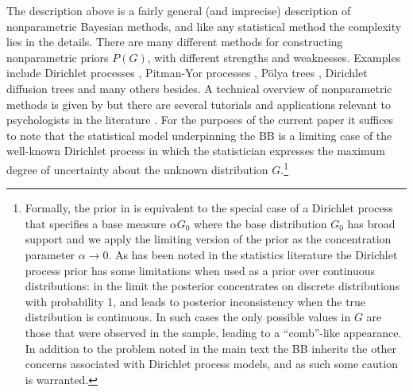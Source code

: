 \documentclass[doc]{apa6}
\begin{document}
{The description above is a fairly general (and imprecise) description of nonparametric Bayesian methods, and like any statistical method the complexity lies in the details. There are many different methods for constructing nonparametric priors $P(G)$, with different strengths and weaknesses. Examples include Dirichlet processes \parencite{ferguson1973bayesian}, Pitman-Yor processes \parencite{pitman1981bessel}, P\"olya trees \parencite{mauldin1992polya}, Dirichlet diffusion trees \parencite{neal2000markov} and many others besides. A technical overview of nonparametric methods is given by \textcite{ghoshbayesian} but there are several tutorials and applications relevant to psychologists in the literature \parencite{navarro2006modeling,gershman2012tutorial,karabatsos2016,Baath_BB}. For the purposes of the current paper it suffices to note that the statistical model underpinning the BB is a limiting case of the well-known Dirichlet process in which the statistician expresses the maximum degree of uncertainty about the unknown distribution $G$.\footnote{Formally, the prior in \protect\textcite{rubin_bayesian_1981} is equivalent to the special case of a Dirichlet process that specifies a base measure $\alpha G_0$ where the base distribution $G_0$ has broad support and we apply the limiting version of the prior as the concentration parameter $\alpha \rightarrow 0$. As has been noted in the statistics literature \protect\parencite{diaconis_consistency_1986} the Dirichlet process prior has some limitations when used as a prior over continuous distributions: in the limit the posterior concentrates on discrete distributions with probability 1, and leads to posterior inconsistency when the true distribution is continuous.   In such cases the only possible values in $G$ are those that were observed in the sample, leading to a ``comb''-like appearance.     In addition to the problem noted in the main text the BB inherits the other concerns associated with Dirichlet process models, and as such some caution is warranted.}


}
\end{document}
